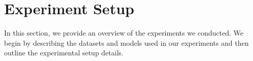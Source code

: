 \documentclass[11pt]{article}
\begin{document}


\section{Experiment Setup}
In this section, we provide an overview of the experiments we conducted.
We begin by describing the datasets and models used in our experiments and then outline the experimental setup details.
\end{document}
